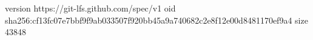 version https://git-lfs.github.com/spec/v1
oid sha256:cf13fc07e7bbf9f9ab033507f920bb45a9a740682c2e8f12e00d8481170ef9a4
size 43848
